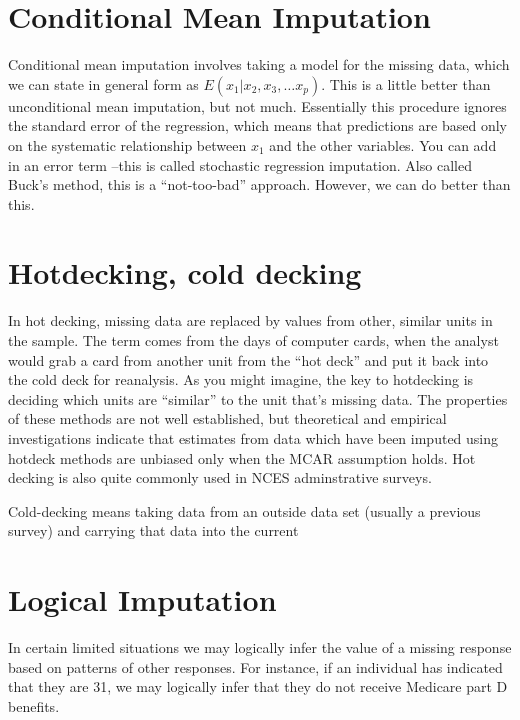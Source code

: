 \documentclass[12 pt]{article}
\begin{document}
\section{Conditional Mean Imputation}
\label{sec:cond-mean-imput}

Conditional mean imputation involves taking a model for the missing
data, which we can state in general form as $E (x_1 |x_2, x_3, \ldots x_p)$.
This is a little better than unconditional mean imputation, but not
much. Essentially this procedure ignores the standard error of the
regression, which means that predictions are based only on the
systematic relationship between $x_1$ and the other variables. You can
add in an error term --this is called stochastic regression
imputation. Also called Buck's method, this is a ``not-too-bad'' approach.
However, we can do better than this.

\section{Hotdecking, cold decking}
\label{sec:hotdecking}

In hot decking, missing data are replaced by values from other,
similar units in the sample. The term comes from the days of computer
cards, when the analyst would grab a card from another unit from the
``hot deck'' and put it back into the cold deck for reanalysis. As you
might imagine, the key to hotdecking is deciding which units are
``similar'' to the unit that's missing data. The properties of these
methods are not well established, but theoretical and empirical
investigations indicate that estimates from data which have been
imputed using hotdeck methods are unbiased only when the MCAR
assumption holds. Hot decking is also quite commonly used in NCES
adminstrative surveys. 

Cold-decking means taking data from an outside data set (usually a
previous survey) and carrying that data into the current

\section{Logical Imputation}
\label{sec:logical-imputation}

In certain limited situations we may logically infer the value of a
missing response based on patterns of other responses. For instance,
if an individual has indicated that they are 31, we may logically
infer that they do not receive Medicare part D benefits.  
\end{document}
